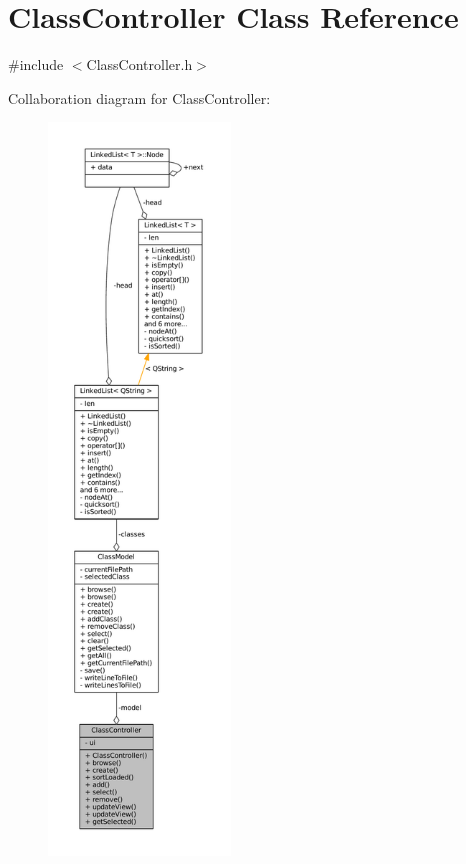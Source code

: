 \hypertarget{classClassController}{}\section{Class\+Controller Class Reference}
\label{classClassController}


{\ttfamily \#include $<$Class\+Controller.\+h$>$}



Collaboration diagram for Class\+Controller\+:
\nopagebreak
\begin{figure}[H]
\begin{center}
\leavevmode
\includegraphics[height=550pt]{classClassController__coll__graph}
\end{center}
\end{figure}
